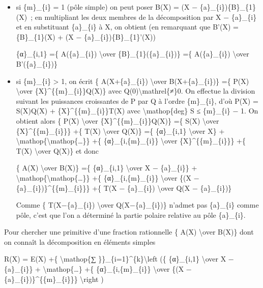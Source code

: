 \documentclass[]{article}
\begin{document}
\begin{itemize}
\item
  si \{m\}\_\{i\} = 1 (pôle simple) on peut poser B(X) = (X −
  \{a\}\_\{i\})\{B\}\_\{1\}(X)~; en multipliant les deux membres de la
  décomposition par X − \{a\}\_\{i\} et en substituant \{a\}\_\{i\} à X,
  on obtient (en remarquant que B'(X) = \{B\}\_\{1\}(X) + (X −
  \{a\}\_\{i\})\{B\}\_\{1\}'(X))

  \{α\}\_\{i,1\} =\{ A(\{a\}\_\{i\}) \textbackslash{}over
  \{B\}\_\{1\}(\{a\}\_\{i\})\} =\{ A(\{a\}\_\{i\}) \textbackslash{}over
  B'(\{a\}\_\{i\})\}
\item
  si \{m\}\_\{i\} \textgreater{} 1, on écrit \{ A(X+\{a\}\_\{i\})
  \textbackslash{}over B(X+\{a\}\_\{i\})\} =\{ P(X) \textbackslash{}over
  \{X\}\^{}\{\{m\}\_\{i\}\}Q(X)\} avec
  Q(0)\textbackslash{}mathrel\{≠\}0. On effectue la division suivant les
  puissances croissantes de P par Q à l'ordre \{m\}\_\{i\}, d'où P(X) =
  S(X)Q(X) + \{X\}\^{}\{\{m\}\_\{i\}\}T(X) avec
  \textbackslash{}mathop\{deg\} S ≤ \{m\}\_\{i\} − 1. On obtient alors
  \{ P(X) \textbackslash{}over \{X\}\^{}\{\{m\}\_\{i\}\}Q(X)\} =\{ S(X)
  \textbackslash{}over \{X\}\^{}\{\{m\}\_\{i\}\}\} +\{ T(X)
  \textbackslash{}over Q(X)\} =\{ \{α\}\_\{i,1\} \textbackslash{}over
  X\} + \textbackslash{}mathop\{\textbackslash{}mathop\{\ldots{}\}\} +\{
  \{α\}\_\{i,\{m\}\_\{i\}\} \textbackslash{}over
  \{X\}\^{}\{\{m\}\_\{i\}\}\} +\{ T(X) \textbackslash{}over Q(X)\} et
  donc

  \{ A(X) \textbackslash{}over B(X)\} =\{ \{α\}\_\{i,1\}
  \textbackslash{}over X − \{a\}\_\{i\}\} +
  \textbackslash{}mathop\{\textbackslash{}mathop\{\ldots{}\}\} +\{
  \{α\}\_\{i,\{m\}\_\{i\}\} \textbackslash{}over \{(X −
  \{a\}\_\{i\})\}\^{}\{\{m\}\_\{i\}\}\} +\{ T(X − \{a\}\_\{i\})
  \textbackslash{}over Q(X − \{a\}\_\{i\})\}

  Comme \{ T(X−\{a\}\_\{i\}) \textbackslash{}over Q(X−\{a\}\_\{i\})\}
  n'admet pas \{a\}\_\{i\} comme pôle, c'est que l'on a déterminé la
  partie polaire relative au pôle \{a\}\_\{i\}.
\end{itemize}

Pour chercher une primitive d'une fraction rationnelle \{ A(X)
\textbackslash{}over B(X)\} dont on connaît la décomposition en éléments
simples

R(X) = E(X) +\{ \textbackslash{}mathop\{∑
\}\}\_\{i=1\}\^{}\{k\}\textbackslash{}left (\{ \{α\}\_\{i,1\}
\textbackslash{}over X − \{a\}\_\{i\}\} +
\textbackslash{}mathop\{\ldots{}\} +\{ \{α\}\_\{i,\{m\}\_\{i\}\}
\textbackslash{}over \{(X − \{a\}\_\{i\})\}\^{}\{\{m\}\_\{i\}\}\}
\textbackslash{}right )
\end{document}
